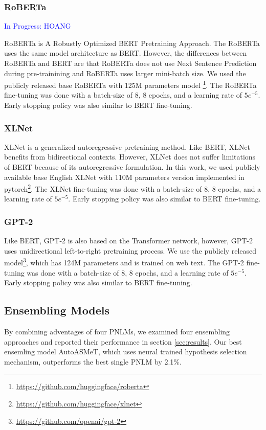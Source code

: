 \documentclass[11pt]{article}
\newcommand{\comment}[1]{\textcolor{blue}{In Progress: #1}}
\begin{document}
\subsubsection{RoBERTa} \comment{HOANG}

RoBERTa is A Robustly Optimized BERT Pretraining Approach. The RoBERTa uses the same model architecture as BERT. However, the differences between RoBERTa and BERT are that RoBERTa does not use Next Sentence Prediction during pre-trainining and RoBERTa uses larger mini-batch size. We used the publicly released base RoBERTa with 125M parameters model \footnote{\url{https://github.com/huggingface/roberta}}. The RoBERTa fine-tuning was done with a batch-size of 8, 8 epochs, and a learning rate of $5e^{-5}$. Early stopping policy was also similar to BERT fine-tuning.

\subsubsection{XLNet}

XLNet is a generalized autoregressive pretraining method. Like BERT, XLNet benefits from bidirectional contexts. However, XLNet does not suffer limitations of BERT because of its autoregressive formulation. In this work, we used publicly available base English XLNet with 110M parameters version implemented in pytorch\footnote{\url{https://github.com/huggingface/xlnet}}. The XLNet fine-tuning was done with a batch-size of 8, 8 epochs, and a learning rate of $5e^{-5}$. Early stopping policy was also similar to BERT fine-tuning.

\subsubsection{GPT-2}

Like BERT, GPT-2 is also based on the Transformer network, however, GPT-2 uses unidirectional left-to-right pretraining process. We use the publicly released model\footnote{\url{https://github.com/openai/gpt-2}}, which has 124M parameters and is trained on web text. The GPT-2 fine-tuning was done with a batch-size of 8, 8 epochs, and a learning rate of $5e^{-5}$. Early stopping policy was also similar to BERT fine-tuning.

\subsection{Ensembling Models}

By combining adventages of four PNLMs, we examined four ensembling approaches and reported their performance in section \ref{sec:results}. Our best ensemling model AutoASMeT, which uses neural trained hypothesis selection mechanism, outperforms the best single PNLM by 2.1\%. 
\end{document}
